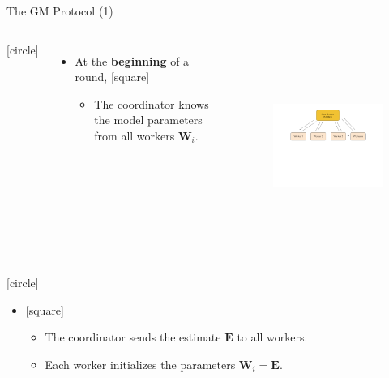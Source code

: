 \begin{frame}{The GM Protocol (1)}
    \begin{columns}
        \vspace{-3cm}
        [circle]
        \begin{itemize}
            \item{At the \textbf{beginning} of a round,
            \vspace{0.2cm}
            [square]
            \begin{itemize}
                \item{The coordinator knows the model parameters from all workers $\pmb{W}_i$.}
            \end{itemize}
            }
        \end{itemize}
        \begin{figure}
            \includegraphics[width=8.5cm,height=6cm,center]{images/ml-fgm-2.png}\label{fig:ml-gm-1}
        \end{figure}
    \end{columns}
    \vspace{-3cm}
    [circle]
    \begin{itemize}
        \item[]{
        [square]
        \begin{itemize}
            \item{The coordinator sends the estimate $\pmb{E}$ to all workers.}
            \vspace{0.3cm}
            \item{Each worker initializes the parameters $\pmb{W}_i=\pmb{E}$.}
        \end{itemize}
        }
    \end{itemize}
\end{frame}

